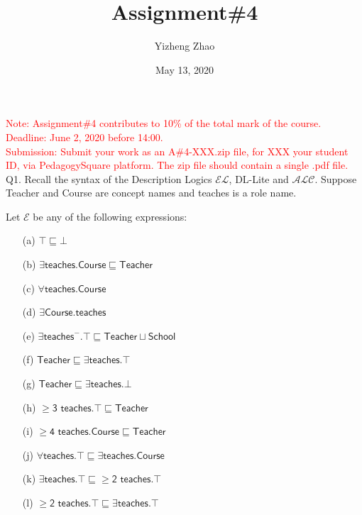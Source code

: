 \documentclass{article}
\title{Assignment\#4}
\author{Yizheng Zhao}
\date{May 13, 2020}
\newcommand{\alc}{$\mathcal{ALC}$\xspace}
\newcommand{\el}{$\mathcal{EL}$\xspace}
\begin{document}
\maketitle

\textcolor{red}{Note: Assignment\#4 contributes to 10\% of the total mark of the course.\\
Deadline: June 2, 2020 before 14:00.\\
Submission: Submit your work as an A\#4-XXX.zip file, for XXX your student ID, via PedagogySquare platform. The zip file should contain a single .pdf file.}\\

Q1. Recall the syntax of the Description Logics \el, DL-Lite and \alc. Suppose \textsf{Teacher} and \textsf{Course} are concept names and \textsf{teaches} is a role name.

Let $\mathcal{E}$ be any of the following expressions:
\begin{itemize}
    \item[(a)] $\top\sqsubseteq\bot$
    \item[(b)] $\exists\textsf{teaches.Course}\sqsubseteq\textsf{Teacher}$
    \item[(c)] $\forall\textsf{teaches.Course}$
    \item[(d)] $\exists\textsf{Course.teaches}$
    \item[(e)] $\exists\textsf{teaches}^{-}.\top\sqsubseteq\textsf{Teacher}\sqcup\textsf{School}$
    \item[(f)] $\textsf{Teacher}\sqsubseteq\exists\textsf{teaches}.\top$
    \item[(g)] $\textsf{Teacher}\sqsubseteq\exists\textsf{teaches}.\bot$
    \item[(h)] $\geq\textsf{3 teaches}.\top\sqsubseteq\textsf{Teacher}$
    \item[(i)] $\geq\textsf{4 teaches.Course}\sqsubseteq\textsf{Teacher}$
    \item[(j)] $\forall\textsf{teaches}.\top\sqsubseteq\exists\textsf{teaches.Course}$
    \item[(k)] $\exists\textsf{teaches}.\top\sqsubseteq\geq\textsf{2 teaches}.\top$
    \item[(l)] $\geq\textsf{2 teaches}.\top\sqsubseteq\exists\textsf{teaches}.\top$
\end{itemize}
\end{document}
